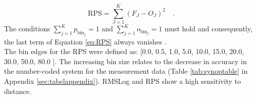 \begin{equation}
    \mathrm{RPS}=\sum_{J=1}^{K} \left( F_{J} - O_{J} \right)^{2} \quad .
    \label{eq:RPS}
\end{equation}
The conditions $ \sum_{j=1}^{K}  p_{\mathrm{bin}_{j}}=1 $ and  $ \sum_{j=1}^{K}  o_{\mathrm{bin}_{j}}=1 $ must hold and consequently, the last term of Equation \eqref{eq:RPS} always vanishes \parencite{wilks2011statistical}.\\
The bin edges for the RPS were defined as: [0.0, 0.5, 1.0, 5.0, 10.0, 15.0, 20.0, 30.0, 50.0, 80.0 ]. The increasing bin size relates to the decrease in accuracy in the number-coded system for the measurement data (Table \ref{tab:synoptable} in Appendix \ref{sec:tabelappendix}).
RMSLog and RPS show a high sensitivity to distance.\\ \\


